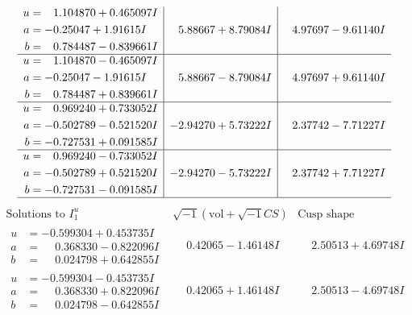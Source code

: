 \documentclass[1p]{elsarticle_modified}
\theoremstyle{definition}
\newcommand{\I}{\sqrt{-1}}
\begin{document}
$$\begin{array}{c|c|c}
\begin{aligned}
u &= \phantom{-}1.104870 + 0.465097 I \\
a &= -0.25047 + 1.91615 I \\
b &= \phantom{-}0.784487 - 0.839661 I\end{aligned}
 & \phantom{-}5.88667 + 8.79084 I & \phantom{-}4.97697 - 9.61140 I \\ \hline\begin{aligned}
u &= \phantom{-}1.104870 - 0.465097 I \\
a &= -0.25047 - 1.91615 I \\
b &= \phantom{-}0.784487 + 0.839661 I\end{aligned}
 & \phantom{-}5.88667 - 8.79084 I & \phantom{-}4.97697 + 9.61140 I \\ \hline\begin{aligned}
u &= \phantom{-}0.969240 + 0.733052 I \\
a &= -0.502789 - 0.521520 I \\
b &= -0.727531 + 0.091585 I\end{aligned}
 & -2.94270 + 5.73222 I & \phantom{-}2.37742 - 7.71227 I \\ \hline\begin{aligned}
u &= \phantom{-}0.969240 - 0.733052 I \\
a &= -0.502789 + 0.521520 I \\
b &= -0.727531 - 0.091585 I\end{aligned}
 & -2.94270 - 5.73222 I & \phantom{-}2.37742 + 7.71227 I\\
 \hline 
 \end{array}$$\newpage$$\begin{array}{c|c|c}  
\text{Solutions to }I^u_{1}& \I (\text{vol} + \sqrt{-1}CS) & \text{Cusp shape}\\
 \hline 
\begin{aligned}
u &= -0.599304 + 0.453735 I \\
a &= \phantom{-}0.368330 - 0.822096 I \\
b &= \phantom{-}0.024798 + 0.642855 I\end{aligned}
 & \phantom{-}0.42065 - 1.46148 I & \phantom{-}2.50513 + 4.69748 I \\ \hline\begin{aligned}
u &= -0.599304 - 0.453735 I \\
a &= \phantom{-}0.368330 + 0.822096 I \\
b &= \phantom{-}0.024798 - 0.642855 I\end{aligned}
 & \phantom{-}0.42065 + 1.46148 I & \phantom{-}2.50513 - 4.69748 I \\ \hline\begin{aligned}

\end{aligned}
\end{array}$$
\end{document}
